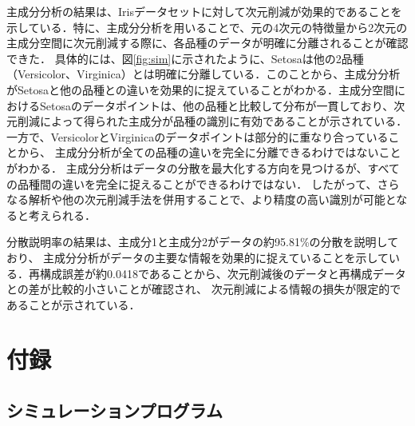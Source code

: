 \documentclass[dvipdfmx,titlepage,a4j]{jsarticle}
\begin{document}
主成分分析の結果は、Irisデータセットに対して次元削減が効果的であることを示している．特に、主成分分析を用いることで、元の4次元の特徴量から2次元の主成分空間に次元削減する際に、各品種のデータが明確に分離されることが確認できた．
具体的には、図\ref{fig:sim}に示されたように、Setosaは他の2品種（Versicolor、Virginica）とは明確に分離している．このことから、主成分分析がSetosaと他の品種との違いを効果的に捉えていることがわかる．主成分空間におけるSetosaのデータポイントは、他の品種と比較して分布が一貫しており、次元削減によって得られた主成分が品種の識別に有効であることが示されている．
一方で、VersicolorとVirginicaのデータポイントは部分的に重なり合っていることから、
主成分分析が全ての品種の違いを完全に分離できるわけではないことがわかる．
主成分分析はデータの分散を最大化する方向を見つけるが、すべての品種間の違いを完全に捉えることができるわけではない．
したがって、さらなる解析や他の次元削減手法を併用することで、より精度の高い識別が可能となると考えられる．

分散説明率の結果は、主成分1と主成分2がデータの約95.81\%の分散を説明しており、
主成分分析がデータの主要な情報を効果的に捉えていることを示している．再構成誤差が約0.0418であることから、次元削減後のデータと再構成データとの差が比較的小さいことが確認され、
次元削減による情報の損失が限定的であることが示されている．

\section{付録}
\subsection{シミュレーションプログラム}



\nocite{*}


\end{document}
